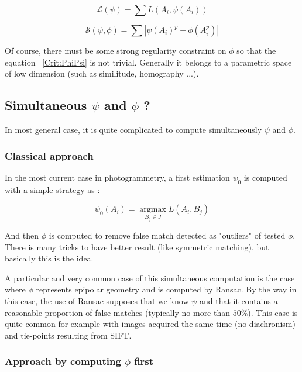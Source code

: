 \begin{equation}
    \mathcal L(\psi) = \sum  L(A_i,\psi(A_i)) \label{Crit:Psi}
\end{equation}


\begin{equation}
    \mathcal S(\psi,\phi) = \sum  | \psi(A_i)^p - \phi(A^p_i) | \label{Crit:PhiPsi}
\end{equation}

Of course, there must be some strong regularity constraint on $\phi$ so that the
equation ~\ref{Crit:PhiPsi} is not trivial. Generally it belongs to a parametric
space of low dimension (such as similitude, homography ...).


\subsection{Simultaneous $\psi$ and $\phi$ ?}

In most general case, it is quite complicated to compute simultaneously $\psi$
and $\phi$.

\subsubsection{Classical approach}
In the most current case in photogrammetry, a first estimation $\psi_0$ is computed with a simple
strategy as :

\begin{equation}
    \psi_0(A_i) =  \underset{B_j \in J}{\operatorname{argmax}}  L(A_i,B_j) \label{ArgMax:Psi}
\end{equation}

And then $\phi$
is computed to remove false match detected as "outliers" of tested $\phi$. 
There is many tricks to have better result (like symmetric matching), but basically
this is the idea.

A particular and very common case of this simultaneous computation is the case
where $\phi$ represents epipolar geometry and is computed by Ransac. By the way in this
case, the  use of Ransac supposes that we know $\psi$ and that it contains a reasonable
proportion of false matches (typically no more than $50\%$). This case is quite common
for example with images acquired the same time (no diachronism) and tie-points resulting
from SIFT.

\subsubsection{Approach by computing $\phi$ first}

